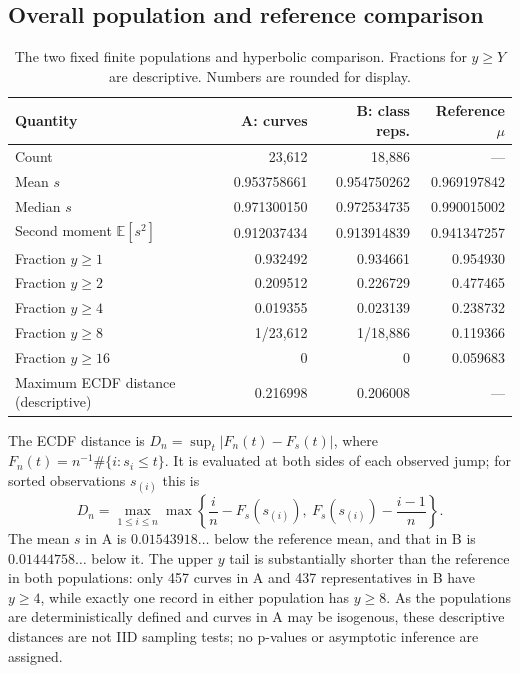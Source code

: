 \documentclass[11pt,a4paper]{article}
\begin{document}
\subsection{Overall population and reference comparison}
\begin{table}[htbp]\centering\small
\caption{The two fixed finite populations and hyperbolic comparison. Fractions for $y\ge Y$ are descriptive. Numbers are rounded for display.}\label{tab:main}
\begin{tabular}{lrrr}\toprule
Quantity&A: curves&B: class reps.&Reference $\mu$\\\midrule
Count&23,612&18,886&---\\
Mean $s$&0.953758661&0.954750262&0.969197842\\
Median $s$&0.971300150&0.972534735&0.990015002\\
Second moment $\mathbb E[s^2]$&0.912037434&0.913914839&0.941347257\\
Fraction $y\ge1$&0.932492&0.934661&0.954930\\
Fraction $y\ge2$&0.209512&0.226729&0.477465\\
Fraction $y\ge4$&0.019355&0.023139&0.238732\\
Fraction $y\ge8$&1/23,612&1/18,886&0.119366\\
Fraction $y\ge16$&0&0&0.059683\\
Maximum ECDF distance (descriptive)&0.216998&0.206008&---\\\bottomrule
\end{tabular}
\end{table}
The ECDF distance is $D_n=\sup_t|F_n(t)-F_s(t)|$, where $F_n(t)=n^{-1}\#\{i:s_i\le t\}$. It is evaluated at both sides of each observed jump; for sorted observations $s_{(i)}$ this is
\[
D_n=\max_{1\le i\le n}\max\left\{\frac{i}{n}-F_s(s_{(i)}),\ F_s(s_{(i)})-\frac{i-1}{n}\right\}.
\]
The mean $s$ in A is $0.01543918\ldots$ below the reference mean, and that in B is $0.01444758\ldots$ below it. The upper $y$ tail is substantially shorter than the reference in both populations: only 457 curves in A and 437 representatives in B have $y\ge4$, while exactly one record in either population has $y\ge8$. As the populations are deterministically defined and curves in A may be isogenous, these descriptive distances are not IID sampling tests; no p-values or asymptotic inference are assigned.
\end{document}
